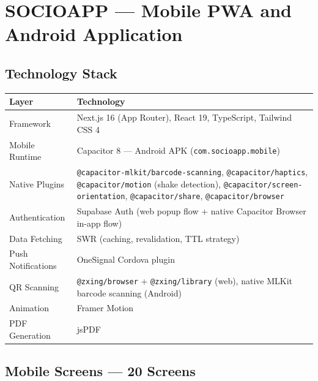 \documentclass[12pt,a4paper]{article}
\begin{document}
\newpage
\section{SOCIOAPP — Mobile PWA and Android Application}

\subsection{Technology Stack}

\begin{tabularx}{\textwidth}{L{3.5cm} X}
\toprule
{}
\textbf{Layer} & \textbf{Technology} \\
\midrule
Framework & Next.js 16 (App Router), React 19, TypeScript, Tailwind CSS 4 \\
Mobile Runtime & Capacitor 8 — Android APK (\texttt{com.socioapp.mobile}) \\
Native Plugins & \texttt{@capacitor-mlkit/barcode-scanning}, \texttt{@capacitor/haptics}, \texttt{@capacitor/motion} (shake detection), \texttt{@capacitor/screen-orientation}, \texttt{@capacitor/share}, \texttt{@capacitor/browser} \\
Authentication & Supabase Auth (web popup flow + native Capacitor Browser in-app flow) \\
Data Fetching & SWR (caching, revalidation, TTL strategy) \\
Push Notifications & OneSignal Cordova plugin \\
QR Scanning & \texttt{@zxing/browser} + \texttt{@zxing/library} (web), native MLKit barcode scanning (Android) \\
Animation & Framer Motion \\
PDF Generation & jsPDF \\
\bottomrule
\end{tabularx}

\subsection{Mobile Screens — 20 Screens}
\end{document}
